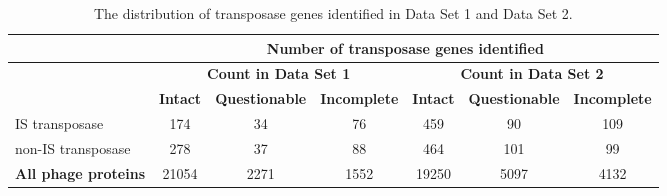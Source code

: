 \renewcommand{\baselinestretch}{1}
\begin{table}
  \centering
  \renewcommand{\arraystretch}{2}
  \begin{tabular}{|l|c|c|c|c|c|c|}
    \hline
    \multirow{3}{*}{} & 
    \multicolumn{6}{c|}{\textbf{Number of transposase genes identified}}\\ \hline
    & \multicolumn{3}{|c|}{\textbf{Count in Data Set 1}} & \multicolumn{3}{c|}{\textbf{Count in Data Set 2}}\\
    \cline{2-7}  
    & \textbf{Intact} & \textbf{Questionable} & \textbf{Incomplete} & \textbf{Intact} & \textbf{Questionable} & \textbf{Incomplete}\\
    \hline
    IS transposase & 174 & 34 & 76 & 459 & 90 & 109 \\ \hline
        non-IS transposase & 278 & 37 & 88 & 464 & 101 & 99\\ \hline
    \hline
    \textbf{All phage proteins} & 21054 & 2271 & 1552 & 19250 & 5097 & 4132 \\ \hline
  \end{tabular}
  \caption{ The distribution of transposase genes identified in Data Set 1 and Data Set 2.}
  \label{tab:transp}
  \end{table}
  \renewcommand{\baselinestretch}{1}


